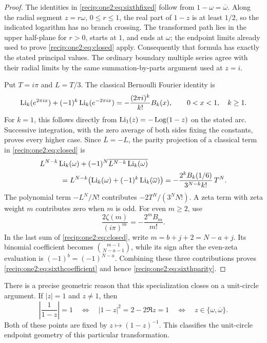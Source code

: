 \begin{proof}
The identities in \eqref{recip:one2:eq:sixthfixed} follow from
$1-\omega=\overline\omega$.  Along the radial segment
$z=r\omega$, $0\le r\le1$, the real part of $1-z$ is at least
$1/2$, so the indicated logarithm has no branch crossing.
The transformed path lies in the upper half-plane for $r>0$,
starts at $1$, and ends at $\omega$; the endpoint limits already
used to prove \eqref{recip:one2:eq:closed} apply.  Consequently that
formula has exactly the stated principal values.  The ordinary
boundary multiple series agree with their radial limits by the
same summation-by-parts argument used at $z=i$.

Put $T=i\pi$ and $L=T/3$.  The classical Bernoulli Fourier identity is
\begin{equation}
 \operatorname{Li}_k(e^{2\pi i x})+(-1)^k\operatorname{Li}_k(e^{-2\pi i x})
       =-\frac{(2\pi i)^k}{k!}B_k(x),
 \qquad 0<x<1,\quad k\ge1.
 \label{recip:one2:eq:bernoullifourier}
\end{equation}
For $k=1$, this follows directly from $\operatorname{Li}_1(z)=-\operatorname{Log}(1-z)$
on the stated arc.  Successive integration, with the zero average
of both sides fixing the constants, proves every higher case.
Since $\overline L=-L$, the parity projection of a classical term
in \eqref{recip:one2:eq:closed} is
\begin{align*}
 &L^{N-k}\operatorname{Li}_k(\omega)
       +(-1)^N\overline{L^{N-k}\operatorname{Li}_k(\omega)}\\
 &\hspace{1cm}=L^{N-k}
    \bigl(\operatorname{Li}_k(\omega)+(-1)^k\operatorname{Li}_k(\overline\omega)\bigr)
   =-\frac{2^k B_k(1/6)}{3^{N-k}k!}\,T^N.
\end{align*}
The polynomial term $-L^N/N!$ contributes
$-2T^N/(3^N N!)$.  A zeta term with zeta weight $m$ contributes
zero when $m$ is odd.  For even $m\ge2$, use
\[
 \frac{2\zeta(m)}{(i\pi)^m}=-\frac{2^m B_m}{m!}.
\]
In the last sum of \eqref{recip:one2:eq:closed}, write
$m=b+j+2=N-a+j$.  Its binomial coefficient becomes
$\binom{m-1}{N-a-1}$, while its sign after the even-zeta evaluation
is $(-1)^b=(-1)^{N-a}$.  Combining these three contributions proves
\eqref{recip:one2:eq:sixthcoefficient} and hence
\eqref{recip:one2:eq:sixthparity}.
\end{proof}

There is a precise geometric reason that this specialization closes
on a unit-circle argument.  If $|z|=1$ and $z\ne1$, then
\[
 \left|\frac1{1-z}\right|=1
 \quad\Longleftrightarrow\quad
 |1-z|^2=2-2\Re z=1
 \quad\Longleftrightarrow\quad z\in\{\omega,\overline\omega\}.
\]
Both of these points are fixed by $z\mapsto(1-z)^{-1}$.
This classifies the unit-circle endpoint geometry of this particular
transformation.


